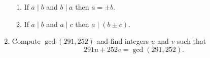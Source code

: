 \documentclass[11pt,letterpaper]{article}
\begin{document}
\begin{enumerate}
\begin{enumerate}
        \item If $a\mid b$ and $b\mid a$ then $a = \pm b$.

        \vfill

        \item If $a\mid b$ and $a\mid c$ then $a\mid (b\pm c)$.
    \end{enumerate}
    \vfill

    \item Compute $\gcd(291, 252)$ and find integers $u$ and $v$ such that
    \[
        291u + 252v = \gcd(291, 252).
    \]
    \vfill
\end{enumerate}
\end{document}
